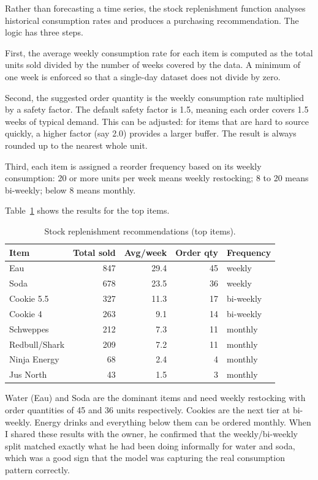 \documentclass[12pt, a4paper]{report}
\begin{document}
Rather than forecasting a time series, the stock replenishment function analyses
historical consumption rates and produces a purchasing recommendation. The logic
has three steps.

First, the average weekly consumption rate for each item is computed as the total
units sold divided by the number of weeks covered by the data. A minimum of one
week is enforced so that a single-day dataset does not divide by zero.

Second, the suggested order quantity is the weekly consumption rate multiplied by
a safety factor. The default safety factor is 1.5, meaning each order covers 1.5
weeks of typical demand. This can be adjusted: for items that are hard to source
quickly, a higher factor (say 2.0) provides a larger buffer. The result is always
rounded up to the nearest whole unit.

Third, each item is assigned a reorder frequency based on its weekly consumption:
20 or more units per week means weekly restocking; 8 to 20 means bi-weekly; below
8 means monthly.

Table~\ref{tab:stock_top} shows the results for the top items.

\begin{table}[H]
  \centering
  \caption{Stock replenishment recommendations (top items).\label{tab:stock_top}}
  \begin{tabular}{lrrrl}
    \toprule
    \textbf{Item} & \textbf{Total sold} & \textbf{Avg/week} &
    \textbf{Order qty} & \textbf{Frequency} \\
    \midrule
    Eau           & 847 & 29.4 & 45 & weekly \\
    Soda          & 678 & 23.5 & 36 & weekly \\
    Cookie 5.5    & 327 & 11.3 & 17 & bi-weekly \\
    Cookie 4      & 263 &  9.1 & 14 & bi-weekly \\
    Schweppes     & 212 &  7.3 & 11 & monthly \\
    Redbull/Shark & 209 &  7.2 & 11 & monthly \\
    Ninja Energy  &  68 &  2.4 &  4 & monthly \\
    Jus North     &  43 &  1.5 &  3 & monthly \\
    \bottomrule
  \end{tabular}
\end{table}

Water (Eau) and Soda are the dominant items and need weekly restocking with order
quantities of 45 and 36 units respectively. Cookies are the next tier at bi-weekly.
Energy drinks and everything below them can be ordered monthly. When I shared these
results with the owner, he confirmed that the weekly/bi-weekly split matched exactly
what he had been doing informally for water and soda, which was a good sign that
the model was capturing the real consumption pattern correctly.
\end{document}
